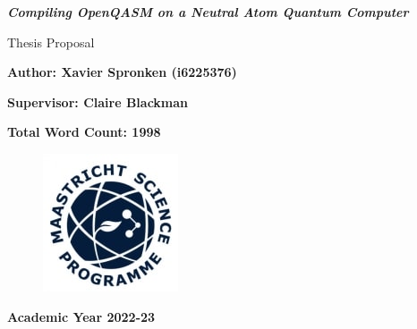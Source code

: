 \documentclass[12pt]{article}
\begin{document}
\begin{titlepage}
    \begin{center}
        \textbf{}
        \vspace{3cm}
        
        \LARGE
        \textbf{\textit{Compiling OpenQASM on a Neutral Atom Quantum Computer}}
        
        \vspace{1cm}
        Thesis Proposal
        
        \vspace{0.7cm}
        \textbf{Author: Xavier Spronken (i6225376)}
        
        \vspace{0.5cm}
        \normalsize
        
        \vspace{1cm}
        \large
        \textbf{Supervisor: Claire Blackman}
        
        \vspace{1cm}
        \textbf{Total Word Count: 1998 \\} 
        \normalsize
        
        \vfill
        
        \begin{figure}[H]
            \centering
            \includegraphics{Images/msp-logo.jpeg}
            \label{fig:msp-logo}
        \end{figure}
        
        \vspace{0.5cm}
        \textbf{Academic Year 2022-23}
        
    \end{center}
\end{titlepage}

\tableofcontents

\newpage






\newpage

 
\end{document}

